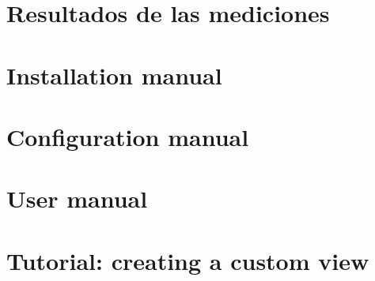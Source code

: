\section{Resultados de las mediciones}
\label{anexo:resultados_mediciones}


\section{Installation manual}
\label{anexo_manual_instalacion}


\section{Configuration manual}
\label{anexo_manual_configuracion}


\section{User manual}
\label{anexo_manual_usuario}


\section{Tutorial: creating a custom view}
\label{anexo_vista_personalizada}



